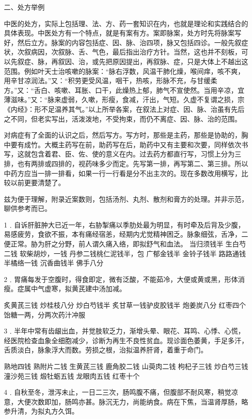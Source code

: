\documentclass[12pt,UTF8]{ctexbook}
\begin{document}
二、处方举例

中医的处方，实际上包括理、法、方、药一套知识在内，也就是理论和实践结合的具体表现。中医处方有一个特点，就是有案有方。案即脉案，处方时先将脉案写好，然后立方。脉案的内容包括症、因、脉、治四项，脉又包括四诊。一般先叙症状，次叙病因，次叙脉、舌、气色，最后指出治疗方针。当然，这也并不刻板，可以先叙症、脉，再叙因、治，或先把原因提出，再叙脉、症，只是大体上不越出这范围。例如叶天士治咳嗽的脉案：“脉右浮数，风温干肺化燥，喉间痒，咳不爽，用辛甘凉润法。”又：“积劳更受风温，咽干，热咳，形脉不充，与甘缓柔方。”又：“舌白、咳嗽、耳胀、口干，此燥热上郁，肺气不宣使然。当用辛凉，宜薄滋味。”又：“脉来虚弱，久嗽，形瘦，食减，汗出，气短。久虚不复谓之损，宗《内经》：形不足温养其气。”以上所举各案，在叙法上对症、因、脉、治虽有先后之不同，但老实写出，活泼泼地，不受拘束，而仍不离症、因、脉、治的范围。

对病症有了全面的认识之后，然后写方。写方时，那些是主药，那些是协助的，胸中要有成竹。大概主药写在前，助药写在后，助药中又有主要和次要，同样依次书写，这就包含着君、臣、佐、使的意义在内。过去药方都直行写，习惯上分为三排，也有两排或四排的，视药味多少而定。先写第一排，再写第二、第三排。所以中药方应当一排一排看，如果一行一行看是分不出主次的。现在多数改用横写，比较以前更要清楚了。

兹为便于理解，附录近案数则，包括汤剂、丸剂、散剂和膏方的处理。并非示范，聊供参考而已。

1﹒自诉肝脏肿大已近一年，右胁掣痛以季肋处最为明显，有时牵及后背及少腹，易感疲劳，食欲不振，本有痛经宿恙，经期内尤觉精神困乏。脉象细弦，舌净，二便正常。胁为肝之分野，前人谓久痛入络，即拟舒气和血法。
当归须钱半 生白芍二钱 软柴胡炒，一钱 丹参二钱桃仁泥钱半，包 广郁金钱半 金铃子钱半 路路通钱半橘络一钱 沉香曲钱半 佛手八分

2﹒胃痛每发于空腹时，得食即定，微有泛酸，不能茹冷，大便或黄或黑，形体消瘦。症属中气虚寒，拟黄芪建中汤加减。

炙黄芪三钱 炒桂枝八分 炒白芍钱半 炙甘草一钱驴皮胶钱半 炮姜炭八分 红枣四个 饴糖一两，分两次药汁冲服

3﹒半年中常有齿龈出血，并觉肢软乏力，渐增头晕、眼花、耳鸣、心悸、心慌，经医院检查血象全细胞减少，诊断为再生不良性贫血。现诊面色萎黄，手足多汗，舌质淡白，脉象浮大而数。劳损之根，治拟温养肝肾，着重于命门。

熟地四钱 熟附片二钱 生黄芪三钱 鹿角胶二钱 山萸肉二钱 枸杞子三钱 炒白芍三钱 潼沙苑三钱 煅牡蛎五钱 龙眼肉五钱 红枣十个

4﹒自秋至冬，泄泻未止，一日二三次，肠鸣腹不痛，但腹部不耐风寒，稍觉凉意，大便次数即加，肠鸣亦甚。脉沉无力，尚能纳食。病在下焦，当温肾厚肠，略参升清，为拟丸方久饵。
\end{document}
